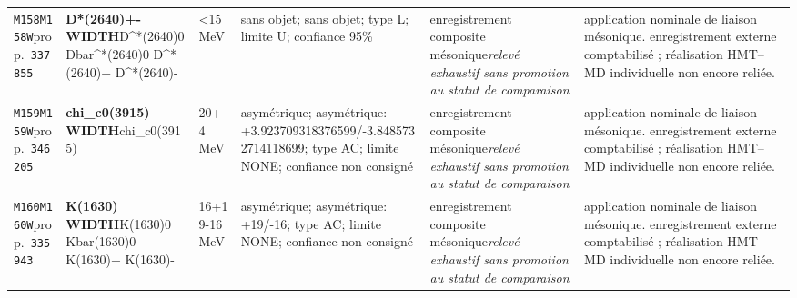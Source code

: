 \begin{landscape}
\begin{longtable}{L{1.85cm}L{4.45cm}L{2.35cm}L{4.05cm}L{3.35cm}L{7.15cm}}
\texttt{M158}\newline \texttt{M158W}\newline prop.\ \texttt{337855} & \textbf{D*(2640)+- WIDTH}\newline D\textasciicircum{}*(2640)0 \textbar{}\allowbreak{} Dbar\textasciicircum{}*(2640)0 \textbar{}\allowbreak{} D\textasciicircum{}*(2640)+ \textbar{}\allowbreak{} D\textasciicircum{}*(2640)- & \textless{}15\,MeV & sans objet; sans objet; type L; limite U; confiance 95\% & enregistrement composite mésonique\newline \emph{relevé exhaustif sans promotion au statut de comparaison} & application nominale de liaison mésonique. enregistrement externe comptabilisé ; réalisation HMT--MD individuelle non encore reliée. \\
\texttt{M159}\newline \texttt{M159W}\newline prop.\ \texttt{346205} & \textbf{chi\_\allowbreak{}c0(3915) WIDTH}\newline chi\_\allowbreak{}c0(3915) & 20+-4\,MeV & asymétrique; asymétrique: +3.923709318376599/-3.8485732714118699; type AC; limite NONE; confiance non consigné & enregistrement composite mésonique\newline \emph{relevé exhaustif sans promotion au statut de comparaison} & application nominale de liaison mésonique. enregistrement externe comptabilisé ; réalisation HMT--MD individuelle non encore reliée. \\
\texttt{M160}\newline \texttt{M160W}\newline prop.\ \texttt{335943} & \textbf{K(1630) WIDTH}\newline K(1630)0 \textbar{}\allowbreak{} Kbar(1630)0 \textbar{}\allowbreak{} K(1630)+ \textbar{}\allowbreak{} K(1630)- & 16+19-16\,MeV & asymétrique; asymétrique: +19/-16; type AC; limite NONE; confiance non consigné & enregistrement composite mésonique\newline \emph{relevé exhaustif sans promotion au statut de comparaison} & application nominale de liaison mésonique. enregistrement externe comptabilisé ; réalisation HMT--MD individuelle non encore reliée. \\

\end{longtable}
\end{landscape}
